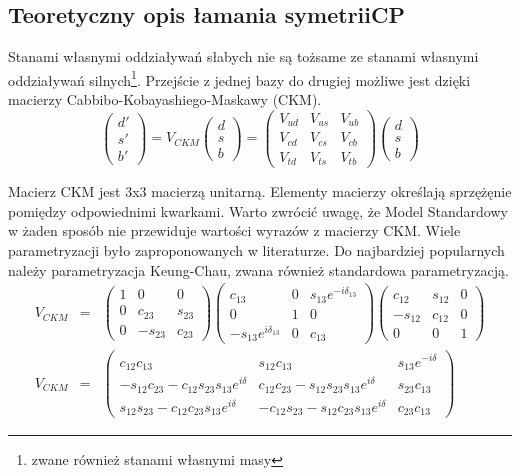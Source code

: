 \subsection{Teoretyczny opis łamania symetrii\textbf{CP} }

Stanami własnymi oddziaływań słabych nie są tożsame ze stanami własnymi oddziaływań silnych\footnote{zwane również stanami własnymi masy}. Przejście z jednej bazy do drugiej możliwe jest dzięki macierzy Cabbibo-Kobayashiego-Maskawy (CKM).
\begin{equation}
\begin{pmatrix}
d'\\ s' \\b'
\end{pmatrix} =V_{CKM} 
\begin{pmatrix}
d\\ s \\b
\end{pmatrix}=\begin{pmatrix}
V_{ud}& V_{us}&V_{ub}\\ V_{cd}& V_{cs}&V_{cb} \\ V_{td}& V_{ts}&V_{tb}
\end{pmatrix} \begin{pmatrix}
d\\ s \\b
\end{pmatrix}
\end{equation}

Macierz CKM jest 3x3 macierzą unitarną. Elementy macierzy określają sprzężęnie pomiędzy odpowiednimi kwarkami. Warto zwrócić uwagę, że Model Standardowy w żaden sposób nie przewiduje wartości wyrazów z macierzy CKM. 
Wiele parametryzacji było zaproponowanych w literaturze. Do najbardziej popularnych należy parametryzacja Keung-Chau, zwana również standardowa parametryzacją. 
\begin{eqnarray}
V_{CKM}&=&\begin{pmatrix} 1 & 0 & 0 \\ 0 & c_{23} & s_{23} \\ 0 & -s_{23} & c_{23} \end{pmatrix}
 \begin{pmatrix} c_{13} & 0 & s_{13}e^{-i\delta_{13}} \\ 0 & 1 & 0 \\ -s_{13}e^{i\delta_{13}} & 0 & c_{13} \end{pmatrix}
 \begin{pmatrix} c_{12} & s_{12} & 0 \\ -s_{12} & c_{12} & 0 \\ 0 & 0 & 1 \end{pmatrix} \nonumber \\
V_{CKM}&=&\begin{pmatrix}
c_{12}c_{13}&s_{12}c_{13}& s_{13}e^{-i\delta} \\
 -s_{12}c_{23}-c_{12}s_{23}s_{13}e^{i\delta} & c_{12}c_{23}-s_{12}s_{23}s_{13}e^{i\delta}  & s_{23}c_{13}\\ s_{12}s_{23}-c_{12}c_{23}s_{13}e^{i\delta} & -c_{12}s_{23}-s_{12}c_{23}s_{13}e^{i\delta} & c_{23}c_{13}
\end{pmatrix}
\end{eqnarray}

